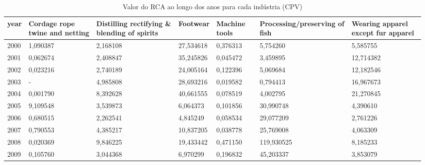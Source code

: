 \begin{table}
\centering
\caption{Valor do RCA ao longo dos anos para cada indústria (CPV)}
\begin{tabular}{p{1cm}p{2cm}p{2cm}p{2cm}p{2cm}p{2cm}p{2cm}}
\toprule
 year &  Cordage rope twine and netting &  Distilling rectifying \& blending of spirits &  Footwear &  Machine tools &  Processing/preserving of fish &  Wearing apparel except fur apparel \\
\midrule
 2000 &                        1,090387 &                                     2,168108 & 27,534618 &       0,376313 &                       5,754260 &                            5,585755 \\
 2001 &                        0,062674 &                                     2,408847 & 35,245826 &       0,045472 &                       3,459895 &                           12,714382 \\
 2002 &                        0,023216 &                                     2,740189 & 24,005164 &       0,122396 &                       5,069684 &                           12,182546 \\
 2003 &                               - &                                     4,985808 & 28,693216 &       0,019582 &                       0,794413 &                           16,967673 \\
 2004 &                        0,001790 &                                     8,392628 & 40,661555 &       0,078519 &                       4,002795 &                           21,270845 \\
 2005 &                        9,109548 &                                     3,539873 &  6,064373 &       0,101856 &                      30,990748 &                            4,390610 \\
 2006 &                        0,680515 &                                     2,262541 &  4,845249 &       0,058534 &                      29,077209 &                            2,761226 \\
 2007 &                        0,790553 &                                     4,385217 & 10,837205 &       0,038778 &                      25,769008 &                            4,063309 \\
 2008 &                        0,020369 &                                     9,846225 & 19,433442 &       0,471150 &                     119,930525 &                            8,185233 \\
 2009 &                        0,105760 &                                     3,044368 &  6,970299 &       0,196832 &                      45,203337 &                            3,853079 \\

\end{tabular}
\end{table}
